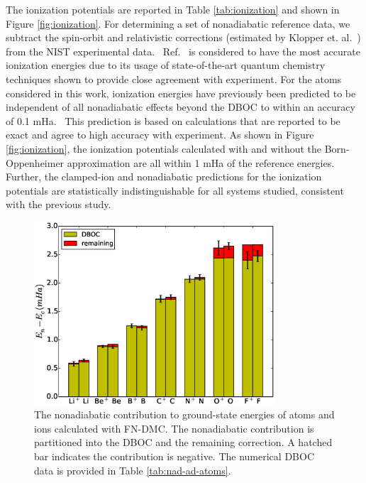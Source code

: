 The ionization potentials are reported in Table \ref{tab:ionization} and shown in Figure \ref{fig:ionization}. For determining a set of nonadiabatic reference data, we subtract the spin-orbit and relativistic corrections (estimated by Klopper et. al.~\cite{Klopper_IP}) from the NIST experimental data.~\cite{NIST_Atoms} Ref.~\cite{Klopper_IP} is considered to have the most accurate ionization energies due to its usage of state-of-the-art quantum chemistry techniques shown to provide close agreement with experiment.
For the atoms considered in this work, ionization energies have previously been predicted to be independent of all nonadiabatic effects beyond the DBOC to within an accuracy of 0.1 mHa.~\cite{Klopper_IP} This prediction is based on calculations that are reported to be exact and agree to high accuracy with experiment. As shown in Figure \ref{fig:ionization}, the ionization potentials calculated with and without the Born-Oppenheimer approximation are all within 1 mHa of the reference energies. Further, the clamped-ion and nonadiabatic predictions for the ionization potentials are statistically indistinguishable for all systems studied, consistent with the previous study.~\cite{Klopper_IP}

\begin{figure}[h]
\includegraphics[width=0.8\textwidth]{atom-nad-ad}
\caption{The nonadiabatic contribution to ground-state energies of atoms and ions calculated with FN-DMC. The nonadiabatic contribution is partitioned into the DBOC and the remaining correction. A hatched bar indicates the contribution is negative. The numerical DBOC data is provided in Table \ref{tab:nad-ad-atoms}. \label{fig:atom-nad-ad}} %
\end{figure}

